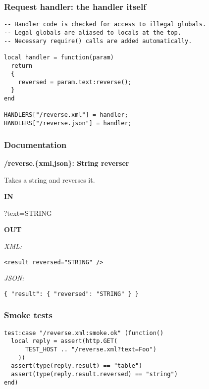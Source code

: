 \documentclass[handout]{beamer}
\begin{document}

\begin{frame}[fragile]

\frametitle{Request handler: the handler itself}

\begin{verbatim}
-- Handler code is checked for access to illegal globals.
-- Legal globals are aliased to locals at the top.
-- Necessary require() calls are added automatically.

local handler = function(param)
  return
  {
    reversed = param.text:reverse();
  }
end

HANDLERS["/reverse.xml"] = handler;
HANDLERS["/reverse.json"] = handler;
\end{verbatim}

\end{frame}


\begin{frame}[fragile]

\frametitle{Documentation}
\large{\textbf{/reverse.\{xml,json\}: String reverser}}

Takes a string and reverses it.

\textbf{IN}
\begin{semiverbatim}
  ?text=STRING
\end{semiverbatim}

\textbf{OUT}

\textit{XML:}

\begin{verbatim}
<result reversed="STRING" />
\end{verbatim}

\textit{JSON:}

\begin{verbatim}
{ "result": { "reversed": "STRING" } }
\end{verbatim}

\end{frame}


\begin{frame}[fragile]

\frametitle{Smoke tests}

\begin{verbatim}
test:case "/reverse.xml:smoke.ok" (function()
  local reply = assert(http.GET(
      TEST_HOST .. "/reverse.xml?text=Foo")
    ))
  assert(type(reply.result) == "table")
  assert(type(reply.result.reversed) == "string")
end)
\end{verbatim}

\end{frame}
\end{document}
